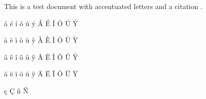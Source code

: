 \documentclass{article}
\begin{document}
This is a test document with accentuated letters and a citation \cite{key}.

á é í ó ú ý Á É Í Ó Ú Ý

à è ì ò ù ỳ À È Ì Ò Ù Ỳ

â ê î ô û ŷ Â Ê Î Ô Û Ŷ

ä ë ï ö ü ÿ Ä Ë Ï Ö Ü Ÿ

ç Ç ñ Ñ



\end{document}
